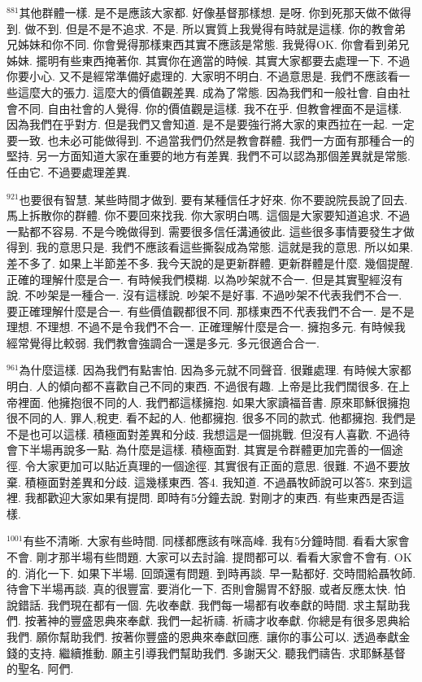 \documentclass{book}
\begin{document}
$^{881}$其他群體一樣.
是不是應該大家都.
好像基督那樣想.
是呀.
你到死那天做不做得到.
做不到.
但是不是不追求.
不是.
所以實質上我覺得有時就是這樣.
你的教會弟兄姊妹和你不同.
你會覺得那樣東西其實不應該是常態.
我覺得OK.
你會看到弟兄姊妹.
擺明有些東西掩著你.
其實你在適當的時候.
其實大家都要去處理一下.
不過你要小心.
又不是經常準備好處理的.
大家明不明白.
不過意思是.
我們不應該看一些這麼大的張力.
這麼大的價值觀差異.
成為了常態.
因為我們和一般社會.
自由社會不同.
自由社會的人覺得.
你的價值觀是這樣.
我不在乎.
但教會裡面不是這樣.
因為我們在乎對方.
但是我們又會知道.
是不是要強行將大家的東西拉在一起.
一定要一致.
也未必可能做得到.
不過當我們仍然是教會群體.
我們一方面有那種合一的堅持.
另一方面知道大家在重要的地方有差異.
我們不可以認為那個差異就是常態.
任由它.
不過要處理差異.

$^{921}$也要很有智慧.
某些時間才做到.
要有某種信任才好來.
你不要說院長說了回去.
馬上拆散你的群體.
你不要回來找我.
你大家明白嗎.
這個是大家要知道追求.
不過一點都不容易.
不是今晚做得到.
需要很多信任溝通彼此.
這些很多事情要發生才做得到.
我的意思只是.
我們不應該看這些撕裂成為常態.
這就是我的意思.
所以如果.
差不多了.
如果上半節差不多.
我今天說的是更新群體.
更新群體是什麼.
幾個提醒.
正確的理解什麼是合一.
有時候我們模糊.
以為吵架就不合一.
但是其實聖經沒有說.
不吵架是一種合一.
沒有這樣說.
吵架不是好事.
不過吵架不代表我們不合一.
要正確理解什麼是合一.
有些價值觀都很不同.
那樣東西不代表我們不合一.
是不是理想.
不理想.
不過不是令我們不合一.
正確理解什麼是合一.
擁抱多元.
有時候我經常覺得比較弱.
我們教會強調合一還是多元.
多元很適合合一.

$^{961}$為什麼這樣.
因為我們有點害怕.
因為多元就不同聲音.
很難處理.
有時候大家都明白.
人的傾向都不喜歡自己不同的東西.
不過很有趣.
上帝是比我們闊很多.
在上帝裡面.
他擁抱很不同的人.
我們都這樣擁抱.
如果大家讀福音書.
原來耶穌很擁抱很不同的人.
罪人,稅吏.
看不起的人.
他都擁抱.
很多不同的款式.
他都擁抱.
我們是不是也可以這樣.
積極面對差異和分歧.
我想這是一個挑戰.
但沒有人喜歡.
不過待會下半場再說多一點.
為什麼是這樣.
積極面對.
其實是令群體更加完善的一個途徑.
令大家更加可以貼近真理的一個途徑.
其實很有正面的意思.
很難.
不過不要放棄.
積極面對差異和分歧.
這幾樣東西.
答4.
我知道.
不過聶牧師說可以答5.
來到這裡.
我都歡迎大家如果有提問.
即時有5分鐘去說.
對剛才的東西.
有些東西是否這樣.

$^{1001}$有些不清晰.
大家有些時間.
同樣都應該有咪高峰.
我有5分鐘時間.
看看大家會不會.
剛才那半場有些問題.
大家可以去討論.
提問都可以.
看看大家會不會有.
OK的.
消化一下.
如果下半場.
回頭還有問題.
到時再談.
早一點都好.
交時間給聶牧師.
待會下半場再談.
真的很豐富.
要消化一下.
否則會腸胃不舒服.
或者反應太快.
怕說錯話.
我們現在都有一個.
先收奉獻.
我們每一場都有收奉獻的時間.
求主幫助我們.
按著神的豐盛恩典來奉獻.
我們一起祈禱.
祈禱才收奉獻.
你總是有很多恩典給我們.
願你幫助我們.
按著你豐盛的恩典來奉獻回應.
讓你的事公可以.
透過奉獻金錢的支持.
繼續推動.
願主引導我們幫助我們.
多謝天父.
聽我們禱告.
求耶穌基督的聖名.
阿們.
\end{document}
